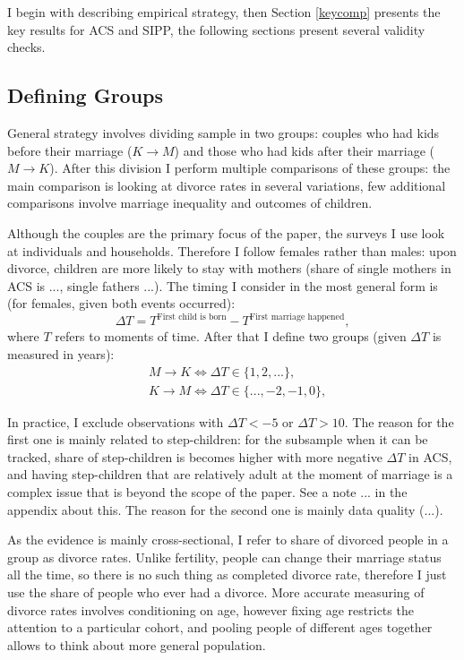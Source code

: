 \documentclass[12pt,letter]{article}
\begin{document}
I begin with describing empirical strategy, then Section \ref{keycomp} presents the key results for ACS and SIPP, the following sections present several validity checks.

\subsection{Defining Groups}

General strategy involves dividing sample in two groups: couples who had kids before their marriage ($K\to M$) and those who had kids after their marriage ($M\to K$). After this division I perform multiple comparisons of these groups: the main comparison is looking at divorce rates in several variations, few additional comparisons involve marriage inequality and outcomes of children.

Although the couples are the primary focus of the paper, the surveys I use look at individuals and households. Therefore I follow females rather than males: upon divorce, children are more likely to stay with mothers (share of single mothers in ACS is ..., single fathers ...). The timing I consider in the  most general form is (for females, given both events occurred): 
\[\Delta T = T^{\text{First child  is born}} - T^{\text{First marriage happened}},\]
where $T$ refers to moments of time. After that I define two groups (given $\Delta T$ is measured in years):
\begin{align*}&M\to K \Leftrightarrow \Delta T \in \{1,2,...\},\\
&K\to M \Leftrightarrow \Delta T \in \{...,-2,-1,0\},\end{align*}

In practice, I exclude observations with $\Delta T < -5$ or $\Delta T > 10$. The reason for the first one is mainly related to step-children: for the subsample when it can be tracked, share of step-children is becomes higher with more negative $\Delta  T$ in ACS, and having step-children that are relatively adult at the moment of marriage is a complex issue that is beyond the scope of the paper. See a note ... in the appendix about this. The reason for the second one is mainly data quality (...).

As the evidence is mainly cross-sectional, I refer to share of divorced people in a group as divorce rates. Unlike fertility, people can change their marriage status all the time, so there is no such thing as completed divorce rate, therefore I just use the share of people who ever had a divorce. More accurate measuring of divorce rates involves conditioning on age, however fixing age restricts the attention to a particular cohort, and pooling people of different ages together allows to think about more general population.
\end{document}
